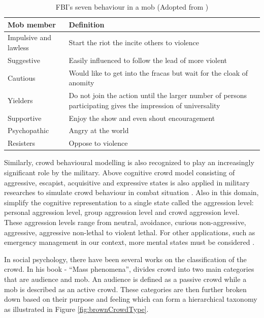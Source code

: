\begin{table}
	\caption{FBI's seven behaviour in a mob (Adopted from \citet{FBI1967})}
	\label{table:fbiMobBehavior}
	\centering
	\begin{tabular}{|l|p{10cm}|}
		\hline
		\textbf{Mob member} & \textbf{Definition} \\ \hline \hline
		Impulsive and lawless & Start the riot the incite others to violence \\ \hline
		Suggestive &  Easily influenced to follow the lead of more violent \\ \hline
		Cautious & Would like to get into the fracas but wait for the cloak of anomity \\ \hline
		Yielders & Do not join the action until the larger number of persons participating gives the impression of universality \\ \hline
		Supportive & Enjoy the show and even shout encouragement \\ \hline
		Psychopathic & Angry at the world \\ \hline
		Resisters & Oppose to violence \\ \hline
	\end{tabular}
\end{table}

Similarly, crowd behavioural modelling is also recognized to play an increasingly significant role by the military. Above cognitive crowd model consisting of aggressive, escapist, acquisitive and expressive states is also applied in military researches to simulate crowd behaviour in combat situation \citep{Petty2004}. Also in this domain, \citet{Nguyen2005} simplify the cognitive representation to a single state called the aggression level: personal aggression level, group aggression level and crowd aggression level. These aggression levels range from neutral, avoidance, curious non-aggressive, aggressive, aggressive non-lethal to violent lethal. For other applications, such as emergency management in our context, more mental states must be considered \citep{Zhou2010}.

In social psychology, there have been several works on the classification of the crowd. In his book - ``Mass phenomena'', \citet{Brown1954} divides crowd into two main categories that are audience and mob. An audience is defined as a passive crowd while a mob is described as an active crowd. These categories are then further broken down based on their purpose and feeling \citep{Pelechano2008} which can form a hierarchical taxonomy as illustrated in Figure \ref{fig:brownCrowdType}.


